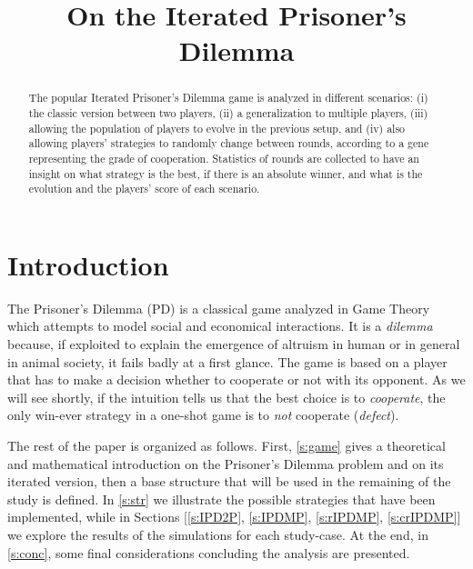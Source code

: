 \documentclass[journal,a4paper,10pt,twoside]{IEEEtran} %
\begin{document}
\title{On the Iterated Prisoner's Dilemma}

\author{%

}

\maketitle

\begin{abstract}
The popular Iterated Prisoner's Dilemma game is analyzed in different scenarios: (i) the classic version between two players, (ii) a generalization to multiple players, (iii) allowing the population of players to evolve in the previous setup, and (iv) also allowing players' strategies to randomly change between rounds, according to a gene representing the grade of cooperation. %
Statistics of rounds are collected to have an insight on what strategy is the best, if there is an absolute winner, and what is the evolution and the players' score of each scenario.
\end{abstract}

\section{Introduction} \label{s:intro}
The Prisoner's Dilemma (PD) is a classical game analyzed in Game Theory which attempts to model social and economical interactions. It is a \textit{dilemma} because, if exploited to explain the emergence of altruism in human or in general in animal society, it fails badly at a first glance. The game is based on a player that has to make a decision whether to cooperate or not with its opponent. As we will see shortly, if the intuition tells us that the best choice is to \textit{cooperate}, the only win-ever strategy in a one-shot game is to \textit{not} cooperate (\textit{defect}).

The rest of the paper is organized as follows.
First, \autoref{s:game} gives a theoretical and mathematical introduction on the Prisoner's Dilemma problem and on its iterated version, then a base structure that will be used in the remaining of the study is defined.
In \autoref{s:str} we illustrate the possible strategies that have been implemented, while in Sections [\ref{s:IPD2P}, \ref{s:IPDMP}, \ref{s:rIPDMP}, \ref{s:crIPDMP}] we explore the results of the simulations for each study-case.
At the end, in \autoref{s:conc}, some final considerations concluding the analysis are presented.
\end{document}
